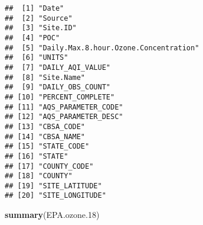 \documentclass[]{article}
\newenvironment{Shaded}{\begin{snugshade}}{\end{snugshade}}
\newcommand{\KeywordTok}[1]{\textcolor[rgb]{0.13,0.29,0.53}{\textbf{#1}}}
\newcommand{\DecValTok}[1]{\textcolor[rgb]{0.00,0.00,0.81}{#1}}
\newcommand{\NormalTok}[1]{#1}
\begin{document}
\begin{verbatim}
##  [1] "Date"                                
##  [2] "Source"                              
##  [3] "Site.ID"                             
##  [4] "POC"                                 
##  [5] "Daily.Max.8.hour.Ozone.Concentration"
##  [6] "UNITS"                               
##  [7] "DAILY_AQI_VALUE"                     
##  [8] "Site.Name"                           
##  [9] "DAILY_OBS_COUNT"                     
## [10] "PERCENT_COMPLETE"                    
## [11] "AQS_PARAMETER_CODE"                  
## [12] "AQS_PARAMETER_DESC"                  
## [13] "CBSA_CODE"                           
## [14] "CBSA_NAME"                           
## [15] "STATE_CODE"                          
## [16] "STATE"                               
## [17] "COUNTY_CODE"                         
## [18] "COUNTY"                              
## [19] "SITE_LATITUDE"                       
## [20] "SITE_LONGITUDE"
\end{verbatim}

\begin{Shaded}
\begin{Highlighting}[]
\KeywordTok{summary}\NormalTok{(EPA.ozone.}\DecValTok{18}\NormalTok{)}
\end{Highlighting}
\end{Shaded}
\end{document}

